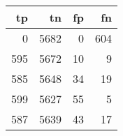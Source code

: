 \begin{tabular}{rrrr}
\toprule
tp & tn & fp & fn \\
\midrule
0 & 5682 & 0 & 604 \\
595 & 5672 & 10 & 9 \\
585 & 5648 & 34 & 19 \\
599 & 5627 & 55 & 5 \\
587 & 5639 & 43 & 17 \\
\bottomrule
\end{tabular}
